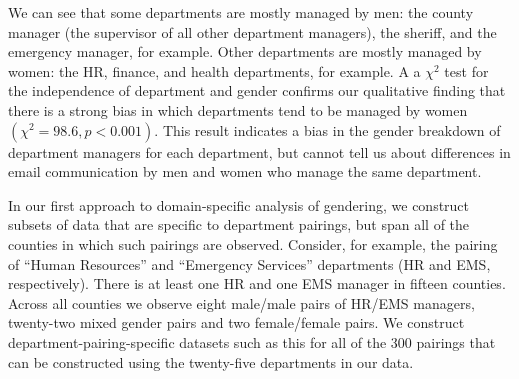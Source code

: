 \documentclass{pnastwo}
\begin{document}
\begin{article}
We can see that some departments are mostly managed by men: the county manager (the supervisor of all other department managers), the sheriff, and the emergency manager, for example. Other departments  are mostly managed by women: the HR, finance, and health departments, for example. A a $\chi^2$ test for the independence of department and gender confirms our qualitative finding that there is a strong bias in which departments tend to be managed by women $(\chi^2 = 98.6, p < 0.001)$. This result indicates a bias in the gender breakdown of department managers for each department, but cannot tell us about differences in email communication by men and women who manage the same department.

In our first approach to domain-specific analysis of gendering, we construct subsets of data that are specific to department pairings, but span all of the counties in which such pairings are observed. Consider, for example, the pairing of ``Human Resources'' and ``Emergency Services'' departments (HR and EMS, respectively). There is at least one HR and one EMS manager in fifteen counties. Across all counties we observe eight male/male pairs of HR/EMS managers, twenty-two mixed gender pairs and two female/female pairs. We construct department-pairing-specific datasets such as this for all of the 300 pairings that can be constructed using the twenty-five departments in our data. 
 

\end{article}
\end{document}
